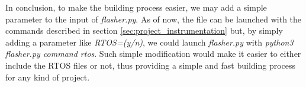 In conclusion, to make the building process easier, we may add a simple parameter
to the input of \textit{flasher.py}. As of now, the file can be launched with
the commands described in section \ref{sec:project_instrumentation} but, by simply
adding a parameter like \textit{RTOS=(y/n)}, we could launch \textit{flasher.py}
with \textit{python3 flasher.py command rtos}. Such simple modification would
make it easier to either include the RTOS files or not, thus providing a simple and
fast building process for any kind of project.